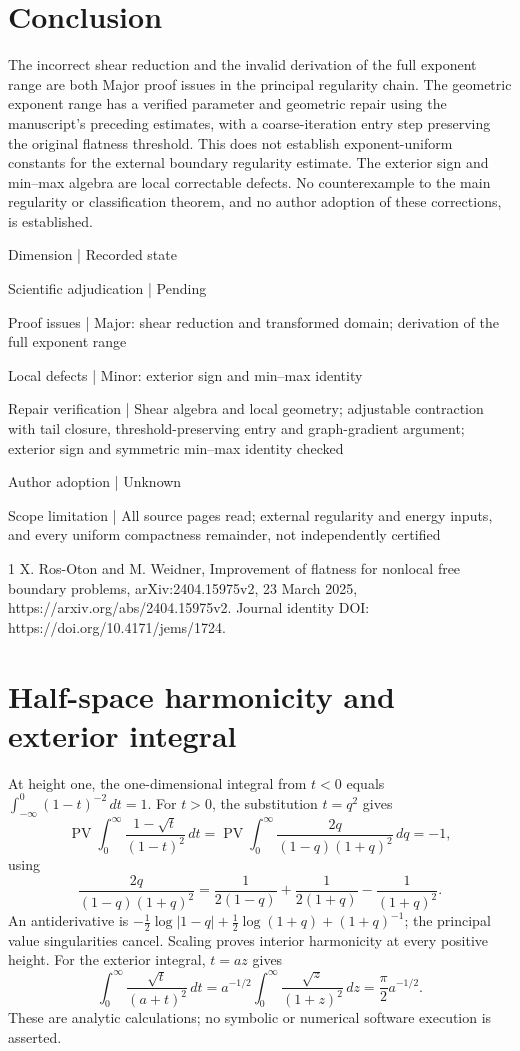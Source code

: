 \documentclass[10pt]{article}
\begin{document}
\section*{Conclusion}
The incorrect shear reduction and the invalid derivation of the full exponent range are both Major proof issues in the principal regularity chain. The geometric exponent range has a verified parameter and geometric repair using the manuscript’s preceding estimates, with a coarse-iteration entry step preserving the original flatness threshold. This does not establish exponent-uniform constants for the external boundary regularity estimate. The exterior sign and min–max algebra are local correctable defects. No counterexample to the main regularity or classification theorem, and no author adoption of these corrections, is established.\par
Dimension | Recorded state\par
Scientific adjudication | Pending\par
Proof issues | Major: shear reduction and transformed domain; derivation of the full exponent range\par
Local defects | Minor: exterior sign and min–max identity\par
Repair verification | Shear algebra and local geometry; adjustable contraction with tail closure, threshold-preserving entry and graph-gradient argument; exterior sign and symmetric min–max identity checked\par
Author adoption | Unknown\par
Scope limitation | All source pages read; external regularity and energy inputs, and every uniform compactness remainder, not independently certified\par
1 X. Ros-Oton and M. Weidner, Improvement of flatness for nonlocal free boundary problems, arXiv:2404.15975v2, 23 March 2025, https://arxiv.org/abs/2404.15975v2. Journal identity DOI: https://doi.org/10.4171/jems/1724.\par
\section*{Half-space harmonicity and exterior integral}
At height one, the one-dimensional integral from \(t<0\) equals \(\int_{-\infty}^0(1-t)^{-2}\,dt=1\). For \(t>0\), the substitution \(t=q^2\) gives \[\mathop{\mathrm{PV}}\int_0^\infty\frac{1-\sqrt t}{(1-t)^2}\,dt
 =\mathop{\mathrm{PV}}\int_0^\infty\frac{2q}{(1-q)(1+q)^2}\,dq=-1,\] using \[\frac{2q}{(1-q)(1+q)^2}
 =\frac1{2(1-q)}+\frac1{2(1+q)}-\frac1{(1+q)^2}.\] An antiderivative is \(-\frac12\log|1-q|+\frac12\log(1+q)+(1+q)^{-1}\); the principal value singularities cancel. Scaling proves interior harmonicity at every positive height. For the exterior integral, \(t=az\) gives \[\int_0^\infty\frac{\sqrt t}{(a+t)^2}\,dt
 =a^{-1/2}\int_0^\infty\frac{\sqrt z}{(1+z)^2}\,dz
 =\frac{\pi}{2}a^{-1/2}.\] These are analytic calculations; no symbolic or numerical software execution is asserted.\par
\end{document}
